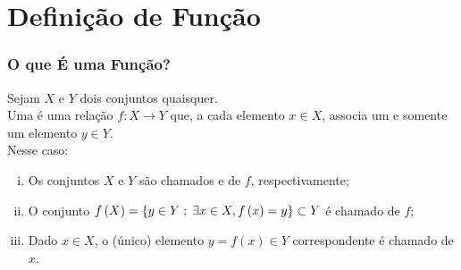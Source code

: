 \documentclass[brazil, notheorems, 10pt]{beamer}
\begin{document}
\begin{comment}
\section{Objetivos}
\frame
{
\frametitle{Objetivos}

\begin{itemize}
\item<1-> Conhecer os \alert{sinais analógicos} e digitais
\item<2-> Fazer uma comparação entre sistemas analógicos e digitais
\item<3-> Conhecer os elementos elétricos passivos : resistor, capacitor e indutor
\item<4-> Conhecer as Leis de Kirchhoff
\item<5-> Conhecer os transistores e os diodos
\item<6-> Analisar as principais aplicações de sistemas digitais.
\end{itemize}

}
\end{comment}


\section{Definição de Função}
\begin{frame} \frametitle{O que É uma Função?}
\begin{Def}
Sejam $X$ e $Y$ dois conjuntos quaisquer.\\
Uma  é uma relação $f: X \to Y$ que, a cada elemento $x
\in X$, associa um e somente um elemento $y \in Y$.\\
Nesse caso:
\begin{enumerate}[(i)]
	\item Os conjuntos $X$ e $Y$ são chamados  e
	 de $f$, respectivamente;
	\item O conjunto $f\left(X\right) = \left\{y \in Y \;;\; \exists x \in X , f \left(x\right) =
	y\right\} \subset Y$ é chamado  de $f$;
	\item Dado $x \in X$, o (único) elemento $y = f(x) \in Y$
	correspondente é chamado  de $x$.
\end{enumerate}
\end{Def}

\end{frame}
\end{document}
